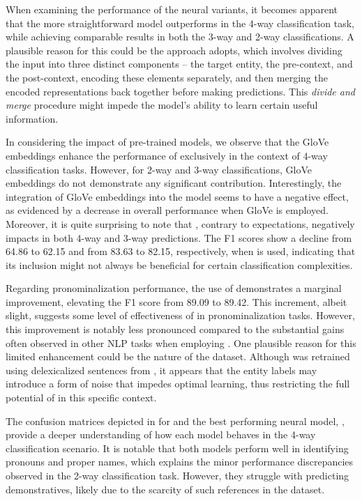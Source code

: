 

When examining the performance of the neural variants, it becomes apparent that the more straightforward  model outperforms  in the 4-way classification task, while achieving comparable results in both the 3-way and 2-way classifications. A plausible reason for this could be the approach  adopts, which involves dividing the input into three distinct components -- the target entity, the pre-context, and the post-context, encoding these elements separately, and then merging the encoded representations back together before making predictions. This \emph{divide and merge} procedure might impede the model’s ability to learn certain useful information.

In considering the impact of pre-trained models, we observe that the GloVe embeddings enhance the performance of  exclusively in the context of 4-way classification tasks. However, for 2-way and 3-way classifications, GloVe embeddings do not demonstrate any significant contribution. Interestingly, the integration of GloVe embeddings into the  model seems to have a negative effect, as evidenced by a decrease in overall performance when GloVe is employed. Moreover, it is quite surprising to note that \bert, contrary to expectations, negatively impacts  in both 4-way and 3-way predictions. The F1 scores show a decline from 64.86 to 62.15 and from 83.63 to 82.15, respectively, when \bert is used, indicating that its inclusion might not always be beneficial for certain classification complexities.

Regarding pronominalization performance, the use of \bert demonstrates a marginal improvement, elevating the F1 score from 89.09 to 89.42. This increment, albeit slight, suggests some level of effectiveness of \bert in pronominalization tasks. However, this improvement is notably less pronounced compared to the substantial gains often observed in other NLP tasks when employing \bert. One plausible reason for this limited enhancement could be the nature of the \webnlg dataset. Although \bert was retrained using delexicalized sentences from \webnlg, it appears that the entity labels may introduce a form of noise that impedes optimal learning, thus restricting the full potential of \bert in this specific context.

The confusion matrices depicted in  for  and the best performing neural model, , provide a deeper understanding of how each model behaves in the 4-way classification scenario. It is notable that both models perform well in identifying pronouns and proper names, which explains the minor performance discrepancies observed in the 2-way classification task. However, they struggle with predicting demonstratives, likely due to the scarcity of such references in the \webnlg dataset.

